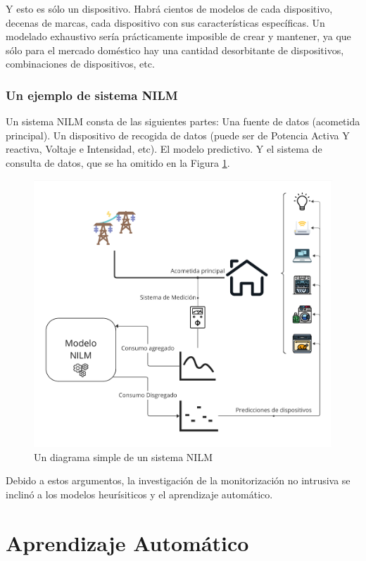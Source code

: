 Y esto es sólo un dispositivo. Habrá cientos de modelos de cada dispositivo, decenas de marcas, cada dispositivo con sus características específicas. 
Un modelado exhaustivo sería prácticamente imposible de crear y mantener, ya que sólo para el mercado doméstico hay una cantidad desorbitante de dispositivos, combinaciones de dispositivos, etc.

\subsubsection{Un ejemplo de sistema NILM}
Un sistema NILM consta de las siguientes partes: Una fuente de datos (acometida principal). Un dispositivo de recogida de datos (puede ser de Potencia Activa Y reactiva, Voltaje e Intensidad, etc). El modelo predictivo. Y el sistema de consulta de datos, que se ha omitido en la Figura \ref{diagramaNILM}.
\begin{figure}
    \centering
    \includegraphics[width=450px]{images/SistemaNILM.pdf}
    \caption{Un diagrama simple de un sistema NILM}
    \label{diagramaNILM}
\end{figure}

Debido a estos argumentos, la investigación de la monitorización no intrusiva se inclinó a los modelos heurísiticos y el aprendizaje automático.


\section{Aprendizaje Automático}


